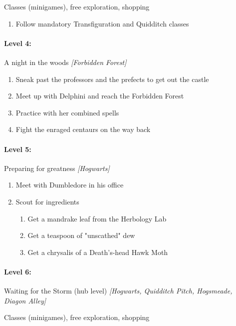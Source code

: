 Classes (minigames), free exploration, shopping
\begin{enumerate}[1)]
	\item Follow mandatory Transfiguration and Quidditch classes
\end{enumerate}

\paragraph{Level 4:} A night in the woods \textit{[Forbidden Forest]}
\begin{enumerate}[1)]
	\item Sneak past the professors and the prefects to get out the castle
	\item Meet up with Delphini and reach the Forbidden Forest
	\item Practice with her combined spells
	\item Fight the enraged centaurs on the way back
\end{enumerate}

\paragraph{Level 5:} Preparing for greatness \textit{[Hogwarts]}
\begin{enumerate}[1)]
	\item Meet with Dumbledore in his office
	\item Scout for ingredients
	\begin{enumerate}[1.]
		\item Get a mandrake leaf from the Herbology Lab
		\item Get a teaspoon of "unscathed" dew
		\item Get a chrysalis of a Death's-head Hawk Moth
	\end{enumerate}
\end{enumerate}

\paragraph{Level 6:} Waiting for the Storm (hub level) \textit{[Hogwarts, Quidditch Pitch, Hogsmeade, Diagon Alley]}

Classes (minigames), free exploration, shopping

